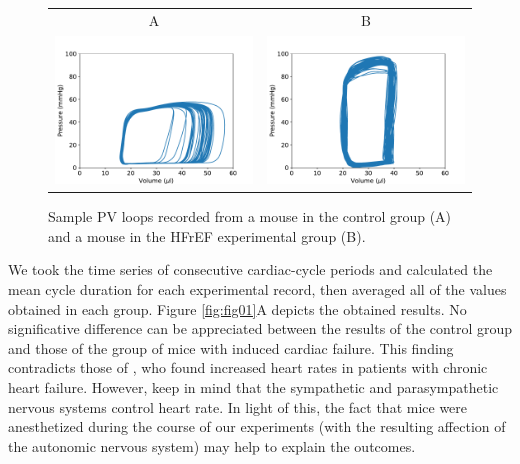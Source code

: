 \documentclass[%
preprint,
 amsmath,amssymb,
 aps,
]{revtex4-2}
\begin{document}
\begin{figure}[h!]
    \begin{tabular}{cc}
        A & B \\
        \includegraphics[width=3in]{PVLoops_A.pdf} &
        \includegraphics[width=3in]{PVLoops_B.pdf}
    \end{tabular}
    \caption{Sample PV loops recorded from a mouse in the control group (A) and a mouse in the HFrEF experimental group (B).}
    \label{fig:PVLoops}
\end{figure}

We took the time series of consecutive cardiac-cycle periods and calculated the mean cycle duration for each experimental record, then averaged all of the values obtained in each group. Figure \ref{fig:fig01}A depicts the obtained results. No significative difference can be appreciated between the results of the control group and those of the group of mice with induced cardiac failure. This finding contradicts those of \citet{Kamen_1995}, who found increased heart rates in patients with chronic heart failure. However, keep in mind that the sympathetic and parasympathetic nervous systems control heart rate. In light of this, the fact that mice were anesthetized during the course of our experiments (with the resulting affection of the autonomic nervous system) may help to explain the outcomes.
\end{document}
